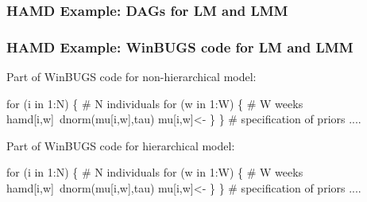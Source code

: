 \documentclass{beamer}
\begin{document}
\begin{frame}[label=current]
    \frametitle{HAMD Example: DAGs for LM and LMM}
    \centerline{}
\end{frame}

\begin{frame}[containsverbatim]
    \frametitle{HAMD Example: WinBUGS code for LM and LMM}
    \vspace{2mm} Part of WinBUGS code for non-hierarchical model:
    \footnotesize
    \begin{ColorVerbatim}			
  for (i in 1:N) \{ # N individuals
    for (w in 1:W) \{ # W weeks			
      hamd[i,w]~dnorm(mu[i,w],tau)
      mu[i,w]<-\color{red}{alpha}\color{black}{+beta[treat[i]]*(w-1)}
    \}					
  \}
  # specification of priors ....			
    \end{ColorVerbatim}
    \vspace{1mm} \normalsize Part of WinBUGS code for hierarchical model:
    \footnotesize
    \begin{ColorVerbatim}
  for (i in 1:N) \{ # N individuals
    for (w in 1:W) \{ # W weeks			
      hamd[i,w]~dnorm(mu[i,w],tau)
      mu[i,w]<-\color{red}{alpha[i]}\color{black}{+beta[treat[i]]*(w-1)}
    \}
    \color{red}{alpha[i]~dnorm(alpha.mu,alpha.tau) # random intercepts}					
  \}
  # specification of priors ....	
    \end{ColorVerbatim}
\end{frame}
\end{document}
